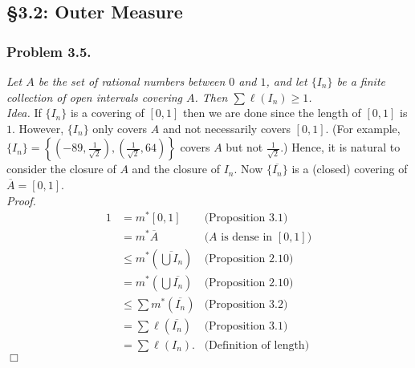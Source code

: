 \documentclass{article}
\begin{document}



\subsection*{\S 3.2: Outer Measure \\}



\subsubsection*{Problem 3.5.}
\emph{Let $A$ be the set of rational numbers between $0$ and $1$, and
let $\{ I_n \}$ be a finite collection of open intervals covering $A$.
Then $\sum \ell(I_n) \geq 1$.} \\



\emph{Idea.}
If $\{ I_n\}$ is a covering of $[0, 1]$ then we are done
since the length of $[0, 1]$ is $1$.
However, $\{ I_n\}$ only covers $A$ and not necessarily covers $[0, 1]$.
(For example,
$\{ I_n \}
= \left\{
\left( -89, \frac{1}{\sqrt{2}} \right),
\left( \frac{1}{\sqrt{2}}, 64 \right)
\right\}$ covers $A$ but not $\frac{1}{\sqrt{2}}$.)
Hence, it is natural to consider the closure of $A$ and
the closure of $I_n$.
Now $\{ \overline{I_n} \}$ is a (closed) covering of
$\overline{A} = [0, 1]$. \\



\emph{Proof.}
\begin{align*}
  1
  &= m^{*}[0, 1]
    &\text{(Proposition 3.1)} \\
  &= m^{*}\overline{A}
    &\text{($A$ is dense in $[0, 1]$)} \\
  &\leq m^{*}\left( \overline{\bigcup I_n} \right)
    &\text{(Proposition 2.10)} \\
  &= m^{*}\left( \bigcup \overline{I_n} \right)
    &\text{(Proposition 2.10)} \\
  &\leq \sum m^{*}(\overline{I_n})
    &\text{(Proposition 3.2)} \\
  &= \sum \ell(\overline{I_n})
    &\text{(Proposition 3.1)} \\
  &= \sum \ell(I_n).
    &\text{(Definition of length)}
  \end{align*}
$\Box$ \\
\end{document}
